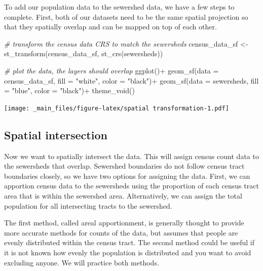\documentclass[
]{book}
\newenvironment{Shaded}{\begin{snugshade}}{\end{snugshade}}
\newcommand{\AttributeTok}[1]{\textcolor[rgb]{0.77,0.63,0.00}{#1}}
\newcommand{\CommentTok}[1]{\textcolor[rgb]{0.56,0.35,0.01}{\textit{#1}}}
\newcommand{\FunctionTok}[1]{\textcolor[rgb]{0.00,0.00,0.00}{#1}}
\newcommand{\NormalTok}[1]{#1}
\newcommand{\OtherTok}[1]{\textcolor[rgb]{0.56,0.35,0.01}{#1}}
\newcommand{\SpecialCharTok}[1]{\textcolor[rgb]{0.00,0.00,0.00}{#1}}
\newcommand{\StringTok}[1]{\textcolor[rgb]{0.31,0.60,0.02}{#1}}
\begin{document}
To add our population data to the sewershed data, we have a few steps to complete. First, both of our datasets need to be the same spatial projection so that they spatially overlap and can be mapped on top of each other.

\begin{Shaded}
\begin{Highlighting}[]
\CommentTok{\# transform the census data CRS to match the sewersheds}
\NormalTok{census\_data\_sf }\OtherTok{\textless{}{-}} \FunctionTok{st\_transform}\NormalTok{(census\_data\_sf, }\FunctionTok{st\_crs}\NormalTok{(sewersheds))}

\CommentTok{\# plot the data, the layers should overlap}
\FunctionTok{ggplot}\NormalTok{()}\SpecialCharTok{+}
  \FunctionTok{geom\_sf}\NormalTok{(}\AttributeTok{data =}\NormalTok{ census\_data\_sf, }\AttributeTok{fill =} \StringTok{"white"}\NormalTok{, }\AttributeTok{color =} \StringTok{"black"}\NormalTok{)}\SpecialCharTok{+}
  \FunctionTok{geom\_sf}\NormalTok{(}\AttributeTok{data =}\NormalTok{ sewersheds, }\AttributeTok{fill =} \StringTok{"blue"}\NormalTok{, }\AttributeTok{color =} \StringTok{"black"}\NormalTok{)}\SpecialCharTok{+}
  \FunctionTok{theme\_void}\NormalTok{()}
\end{Highlighting}
\end{Shaded}

\texttt{[image: \_main\_files/figure-latex/spatial transformation-1.pdf]}

\hypertarget{spatial-intersection}{%
\subsection{Spatial intersection}\label{spatial-intersection}}

Now we want to spatially intersect the data. This will assign census count data to the sewersheds that overlap. Sewershed boundaries do not follow census tract boundaries closely, so we have two options for assigning the data. First, we can apportion census data to the sewersheds using the proportion of each census tract area that is within the sewershed area. Alternatively, we can assign the total population for all intersecting tracts to the sewershed.

The first method, called areal apportionment, is generally thought to provide more accurate methods for counts of the data, but assumes that people are evenly distributed within the census tract. The second method could be useful if it is not known how evenly the population is distributed and you want to avoid excluding anyone. We will practice both methods.
\end{document}
